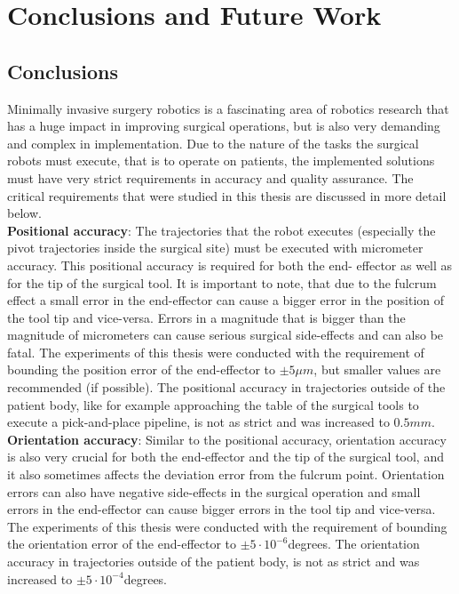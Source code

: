 \chapter{Conclusions and Future Work}

\section{Conclusions}

Minimally invasive surgery robotics is a fascinating area of robotics research that has a huge impact in improving surgical operations, but is also very demanding and complex in implementation. Due to the nature of the tasks 
the surgical robots must execute, that is to operate on patients, the implemented solutions must have very strict requirements in accuracy and quality assurance. The critical requirements that were studied in this thesis are 
discussed in more detail below.\\

\textbf{Positional accuracy}: The trajectories that the robot executes (especially the pivot trajectories inside the surgical site) must be executed with micrometer accuracy. This positional accuracy is required for both the end-
effector as well as for the tip of the surgical tool. It is important to note, that due to the fulcrum effect a small error in the end-effector can cause a bigger error in the position of the tool tip and vice-versa. Errors 
in a magnitude that is bigger than the magnitude of micrometers can cause serious surgical side-effects and can also be fatal. The experiments of this thesis were conducted with the requirement of bounding the position error 
of the end-effector to $\pm 5μm$, but smaller values are recommended (if possible). The positional accuracy in trajectories outside of the patient body, like for example approaching the table of the surgical tools to execute a 
pick-and-place pipeline, is not as strict and was increased to $0.5mm$.\\

\textbf{Orientation accuracy}: Similar to the positional accuracy, orientation accuracy is also very crucial for both the end-effector and the tip of the surgical tool, and it also sometimes affects the deviation error from the 
fulcrum point. Orientation errors can also have negative side-effects in the surgical operation and small errors in the end-effector can cause bigger errors in the tool tip and vice-versa. The experiments of this thesis were 
conducted with the requirement of bounding the orientation error of the end-effector to $\pm 5\cdot 10^{-6}$degrees. The orientation accuracy in trajectories outside of the patient body, is not as strict and was increased to 
$\pm 5\cdot 10^{-4}$degrees.\\

